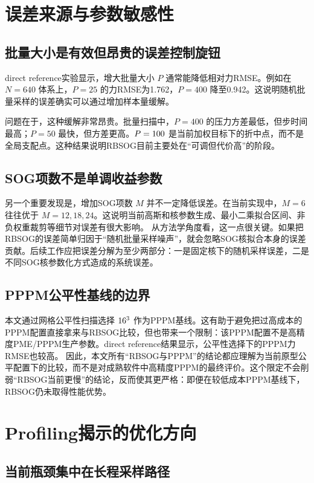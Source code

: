 \section{误差来源与参数敏感性}

\subsection{批量大小是有效但昂贵的误差控制旋钮}

direct reference实验显示，增大批量大小 $P$ 通常能降低相对力RMSE。例如在 $N=640$ 体系上，$P=25$ 的力RMSE为1.762，$P=400$ 降至0.942。这说明随机批量采样的误差确实可以通过增加样本量缓解。

问题在于，这种缓解非常昂贵。批量扫描中，$P=400$ 的压力方差最低，但步时间最高；$P=50$ 最快，但方差更高。$P=100$ 是当前加权目标下的折中点，而不是全局支配点。这种结果说明RBSOG目前主要处在“可调但代价高”的阶段。

\subsection{SOG项数不是单调收益参数}

另一个重要发现是，增加SOG项数 $M$ 并不一定降低误差。在当前实现中，$M=6$ 往往优于 $M=12,18,24$。这说明当前高斯和核参数生成、最小二乘拟合区间、非负权重裁剪等细节对误差有很大影响。
从方法学角度看，这一点很关键。如果把RBSOG的误差简单归因于“随机批量采样噪声”，就会忽略SOG核拟合本身的误差贡献。后续工作应把误差分解为至少两部分：一是固定核下的随机采样误差，二是不同SOG核参数化方式造成的系统误差。

\subsection{PPPM公平性基线的边界}

本文通过网格公平性扫描选择 $16^3$ 作为PPPM基线。这有助于避免把过高成本的PPPM配置直接拿来与RBSOG比较，但也带来一个限制：该PPPM配置不是高精度PME/PPPM生产参数。direct reference结果显示，公平性选择下的PPPM力RMSE也较高。
因此，本文所有“RBSOG与PPPM”的结论都应理解为当前原型公平配置下的比较，而不是对成熟软件中高精度PPPM的最终评价。这个限定不会削弱“RBSOG当前更慢”的结论，反而使其更严格：即便在较低成本PPPM基线下，RBSOG仍未取得性能优势。

\section{Profiling揭示的优化方向}

\subsection{当前瓶颈集中在长程采样路径}

